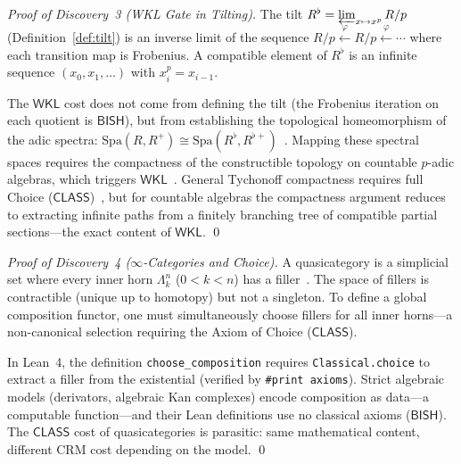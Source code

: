 \documentclass[11pt,a4paper]{article}
\theoremstyle{plain}
\theoremstyle{definition}
\newcommand{\BISH}{\textsf{BISH}}
\newcommand{\WKL}{\textsf{WKL}}
\newcommand{\CLASS}{\textsf{CLASS}}
\newcommand{\Spa}{\mathrm{Spa}}
\begin{document}
\begin{proof}[Proof of Discovery~3 (WKL Gate in Tilting)]
The tilt $R^\flat = \varprojlim_{x \mapsto x^p} R/p$ (Definition~\ref{def:tilt}) is an inverse limit of the sequence $R/p \xleftarrow{\varphi} R/p \xleftarrow{\varphi} \cdots$ where each transition map is Frobenius. A compatible element of $R^\flat$ is an infinite sequence $(x_0, x_1, \ldots)$ with $x_i^p = x_{i-1}$.

The $\WKL$ cost does not come from defining the tilt (the Frobenius iteration on each quotient is $\BISH$), but from establishing the topological homeomorphism of the adic spectra: $\Spa(R, R^+) \cong \Spa(R^\flat, R^{\flat+})$~\cite{scholze-perfectoid12}. Mapping these spectral spaces requires the compactness of the constructible topology on countable $p$-adic algebras, which triggers $\WKL$~\cite{simpson09}. General Tychonoff compactness requires full Choice ($\CLASS$)~\cite{kelley55}, but for countable algebras the compactness argument reduces to extracting infinite paths from a finitely branching tree of compatible partial sections---the exact content of $\WKL$. \qed
\end{proof}

\begin{proof}[Proof of Discovery~4 ($\infty$-Categories and Choice)]
A quasicategory is a simplicial set where every inner horn $\Lambda^n_k$ ($0 < k < n$) has a filler~\cite{lurie09}. The space of fillers is contractible (unique up to homotopy) but not a singleton. To define a global composition functor, one must simultaneously choose fillers for all inner horns---a non-canonical selection requiring the Axiom of Choice ($\CLASS$).

In Lean~4, the definition \texttt{choose\_composition} requires \texttt{Classical.choice} to extract a filler from the existential (verified by \texttt{\#print axioms}). Strict algebraic models (derivators, algebraic Kan complexes) encode composition as data---a computable function---and their Lean definitions use no classical axioms ($\BISH$). The $\CLASS$ cost of quasicategories is parasitic: same mathematical content, different CRM cost depending on the model. \qed
\end{proof}
\end{document}
